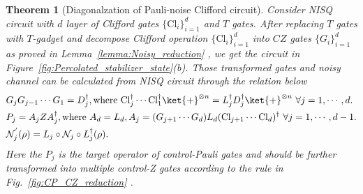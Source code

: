 \documentclass[aps,%
twocolumn,%
floatfix,%
pra,%
amsfonts,%
longbibliography,%
groupedaddress,%
superscriptaddress]{revtex4-2}%
\newtheorem{theorem}{Theorem}
\newcommand{\1}{\mathbbm{1}}
\begin{document}
\begin{theorem}[Diagonalzation of Pauli-noise Clifford circuit]
\label{theo:diagonalzation}
Consider NISQ circuit with $d$ layer of Clifford gates  $\{\text{Cl}_i\}_{i =1}^d$  and $T$ gates. After replacing $T$ gates with $T$-gadget and decompose Clifford operation $\{\text{Cl}_i\}_{i =1}^d$ into $CZ$ gates $\{G_i\}_{i =1}^d$ as proved in Lemma~\ref{lemma:Noisy_reduction} , we get the circuit in Figure~\ref{fig:Percolated_stabilizer_state}(b). Those transformed gates and noisy channel can be calculated from NISQ circuit through the relation below
\begin{align}
    &G_j G_{j-1}\cdots G_1=D_j^\dagger,
    \text{where~}\text{Cl}_j^\dagger \cdots \text{Cl}_1^\dagger \ket{+}^{\otimes n} = L_j^\dagger D_j^\dagger \ket{+}^{\otimes n}   ~\forall j = 1, \cdots, d.  \\
     &P_{j}= A_j Z A_j^\dagger,\text{where~} A_d = L_d, A_j =   (G_{j+1} \cdots G_d )L_d(\text{Cl}_{j+1} \cdots\text{Cl}_d)^\dagger ~\forall j = 1, \cdots,d-1. \\
    &\mathcal{N}_j^{'}(\rho) = L_j\circ \mathcal{N}_j \circ L_j^\dagger(\rho) .
\end{align}
Here the $P_j$ is the target operator of control-Pauli gates and should be further transformed into multiple control-Z gates according to the rule in Fig.~\ref{fig:CP_CZ_reduction} . 
\end{theorem}
\end{document}
